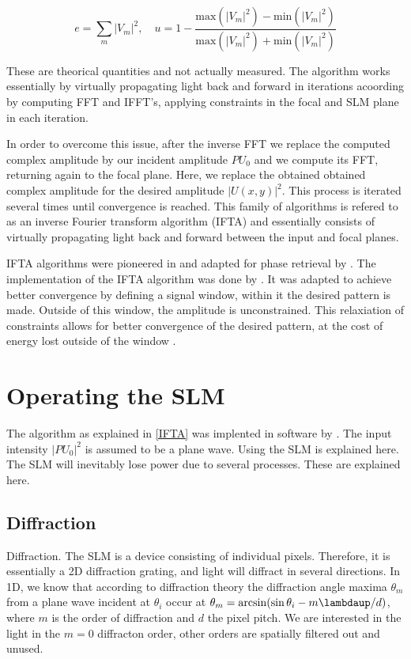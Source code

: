 \begin{equation}\label{EfficiencyUniformity}
    e = \sum_m |V_m|^2, \quad u= 1-\frac{\text{max}(|V_m|^2)-\text{min}(|V_m|^2)}{\text{max}(|V_m|^2)+\text{min}(|V_m|^2)}
\end{equation}

These are theorical quantities and not actually measured. The algorithm works essentially by virtually propagating light back and forward in iterations acoording by computing FFT and IFFT's, applying constraints in the focal and SLM plane in each iteration. 




In order to overcome this issue, after the inverse FFT we replace the computed complex amplitude by our incident amplitude $PU_0$ and we compute its FFT, returning again to the focal plane. Here, we replace the obtained obtained complex amplitude for the desired amplitude $|U(x,y)|^2$. This process is iterated several times until convergence is reached. This family of algorithms is refered to as an inverse Fourier transform algorithm (IFTA) and essentially consists of virtually propagating light back and forward between the input and focal planes. 

IFTA algorithms were pioneered in\cite{Hirsch1971} and adapted for phase retrieval by \cite{Gerschberg1972}. The implementation of the IFTA algorithm was done by \cite{Bijnen2013,Bijnen2015}. It was adapted to achieve better convergence by defining a signal window, within it the desired pattern is made. Outside of this window, the amplitude is unconstrained. This relaxiation of constraints allows for better convergence of the desired pattern, at the cost of energy lost outside of the window \cite{Bijnen2013,Bijnen2015}.

\section{Operating the SLM}

The algorithm as explained in \cref{IFTA} was implented in software by \cite{Bijnen2015}. The input intensity $|PU_0|^2$ is assumed to be a plane wave. Using the SLM is explained here. The SLM will inevitably lose power due to several processes. These are explained here. 

\subsection{Diffraction}

Diffraction. The SLM is a device consisting of individual pixels. Therefore, it is essentially a 2D diffraction grating, and light will diffract in several directions. In 1D, we know that according to diffraction theory the diffraction angle maxima $\theta_m$ from a plane wave incident at $\theta_i$ occur at $\theta_m = \arcsin(\sin\theta_i - m\lambdaup/d)$, where $m$ is the order of diffraction and $d$ the pixel pitch. We are interested in the light in the $m=0$ diffracton order, other orders are spatially filtered out and unused.

